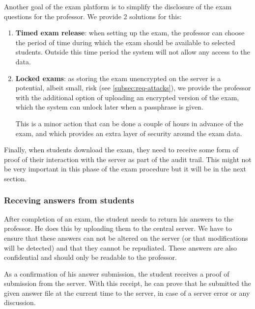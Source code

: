 \documentclass[12pt]{article}
\begin{document}
Another goal of the exam platform is to simplify the disclosure of the exam
questions for the professor. We provide 2 solutions for this:

\begin{enumerate}

\item \textbf{Timed exam release}: when setting up the exam, the professor can
choose the period of time during which the exam should be available to selected
students. Outside this time period the system will not allow any access to the
data.

\item \textbf{Locked exams}: as storing the exam unencrypted on the server is a
potential, albeit small, risk (see \autoref{subsec:req-attacks}), we provide the
professor with the additional option of uploading an encrypted version of the
exam, which the system can unlock later when a passphrase is given.

This is a minor action that can be done a couple of hours in advance of the
exam, and which provides an extra layer of security around the exam data.

\end{enumerate}

Finally, when students download the exam, they need to receive some form of
proof of their interaction with the server as part of the audit trail. This
might not be very important in this phase of the exam procedure but it will be
in the next section.

\subsubsection{Receving answers from students}
\label{subsubsec:req-func-answers}


After completion of an exam, the student needs to return his answers to the
professor. He does this by uploading them to the central server. We have to
ensure that these answers can not be altered on the server (or that
modifications will be detected) and that they cannot be repudiated. These
answers are also confidential and should only be readable to the professor.

As a confirmation of his answer submission, the student receives a proof of
submission from the server. With this receipt, he can prove that he submitted
the given answer file at the current time to the server, in case of a server
error or any discussion.
\end{document}
